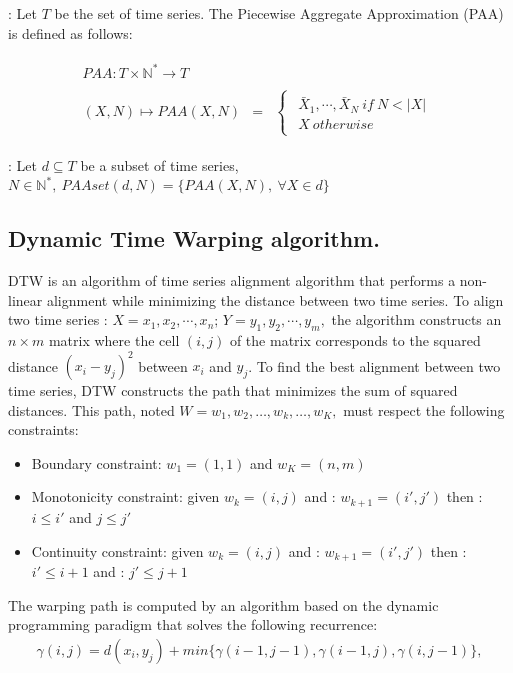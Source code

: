 \begin{definition}:
Let $T$ be the set of time series. The Piecewise Aggregate Approximation (PAA) is defined as follows:

\begin{eqnarray}
\begin{array}{ccc}
 PAA: T\times\mathbb{N^{*}}\rightarrow T\\
\\
(X,N)\mapsto PAA(X,N) & = &
 \begin{cases}
 \begin{array}{c}
\bar{X}_{1},\cdots,\bar{X}_{N}\:if\:N<|X|\\
X\:otherwise
\end{array}
\end{cases}
\end{array}
\end{eqnarray}

\end{definition} 

\begin{definition}:
Let $d\subseteq T$ be a subset of time series,
$N\in\mathbb{N}^{*},\:PAAset(d,N)=\{PAA(X,N),\:\forall X\in d\}$
\end{definition}

\subsection{Dynamic Time Warping algorithm.}
DTW \cite{sakoe1978dynamic} is an algorithm of time series alignment
algorithm that  performs a non-linear alignment while
minimizing the distance between two time series. To align two time series : 
$X=x_{1},x_{2},\cdots,x_{n};\,
Y=y_{1},y_{2},\cdots,y_{m},$ the algorithm constructs an  $n\times m$  matrix where the cell $(i,
j)$ of the matrix corresponds to the squared distance $(x_{i}-y_{j})^{2}$ between $x_{i}$
and $y_{j}$. To find the best alignment between two time series, DTW constructs the path that minimizes the sum of squared distances. This path, noted
$W = w_1, w_2, \ldots, w_k, \ldots, w_K,$ must respect the following constraints:
\begin{itemize}
  \item Boundary constraint: $w_1 = (1, 1)$ and  $w_K = (n, m)$
  \item Monotonicity constraint: given $w_k = (i, j)$ and :  $w_{k + 1} =
  (i',j')$ then : $i \leq i'$ and $j \leq j'$
 \item Continuity constraint: given $w_k = (i, j)$ and :   $w_{k + 1} = (i', j')$
 then : $i' \leq i + 1$ and : $j' \leq j + 1$
\end{itemize}
The warping path is computed by  an algorithm based on the dynamic
programming paradigm that solves the following recurrence:
\begin{eqnarray}
\gamma(i,j)=d(x_{i},y_{j})+min\{\gamma(i-1, j-1),\gamma(i-1, j),\gamma(i, j-1)\},
\end{eqnarray}


